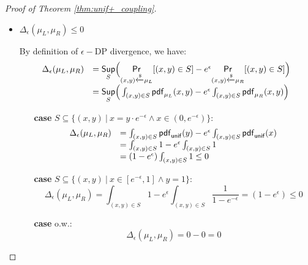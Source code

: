 \documentclass[a4paper,11pt]{article}
\begin{document}
\begin{proof}[Proof of Theorem \ref{thm:unif+_coupling}]
\begin{itemize}
\begin{itemize}
		\item $\projr(\mu_R) = \mu_2$ 

		Equivalent to show$\pdf_{\projr(\mu_R)}  = \pdf_{\mu_2}$.

		By definition of the $\projr$ and $\pdf$ of $\mu_R$, we have $\forall y \in \float$:
		\[
			\pdf_{\projr(\mu_R)}(y) = 
			\begin{cases}
			\int_{x}\pdf_{\uniform}(x) 
			& x = y \cdot e^{-\epsilon} \land y \in (0, 1)\\
			\int_{x} \frac{1}{1 - e^{-\epsilon}} 
			& x \in [e^{-\epsilon}, 1] \land y = 1\\
			0       & o.w.
			\end{cases} 
			= 
			\begin{cases}
			1 & y \in (0, 1)\\
			1 & y = 1\\
			0       & o.w.
			\end{cases}
			=
			\pdf_{\mu_2}(y)
		\]
	\end{itemize}	

	\item $\Delta_{\epsilon}(\mu_L, \mu_R) \leq 0$

	By definition of $\epsilon-$DP divergence, we have:
	 \[
	 \begin{array}{ll}
	 \Delta_{\epsilon}(\mu_L, \mu_R) 
	 & = \underset{S}{\mathsf{Sup}}
	 \Big(
	 \underset{(x,y) \xleftarrow{\$} \mu_L}{\mathsf{Pr}}[(x,y) \in S] - e^{\epsilon} \underset{(x,y) \xleftarrow{\$} \mu_R}{\mathsf{Pr}}[(x,y) \in S]
	 \Big) \\
	 & =\underset{S}{\mathsf{Sup}}
	 \Big(
	 \int_{(x,y) \in S} \mathsf{pdf}_{\mu_L}(x, y) - e^{\epsilon} \int_{(x,y) \in S} \mathsf{pdf}_{\mu_R}(x, y)
	 \Big)	 
	 \end{array}
	 \]
	 \begin{itemize}
	 	\item[{\bf case}]
	 	$S \subseteq \{(x, y) ~|~ 
	 	x = y \cdot e^{-\epsilon}  \land x \in (0, e^{-\epsilon}) \}$:
		\[
		 \begin{array}{ll}
		 \Delta_{\epsilon}(\mu_L, \mu_R) 
		 & = 
		 \int_{(x,y) \in S} \mathsf{pdf}_{\mathsf{unif}}(y) - e^{\epsilon} \int_{(x,y) \in S} \mathsf{pdf}_{\mathsf{unif}}(x)\\
		 & = 
		 \int_{(x,y) \in S} 1 - e^{\epsilon} \int_{(x,y) \in S} 1\\ 
		 & = 
		 (1 - e^{\epsilon})\int_{(x,y) \in S} 1
		 \leq 0 
		 \end{array}
		 \]
	 	\item[{\bf case}] $S \subseteq \{(x, y) 
	 	~|~ x \in [e^{-\epsilon}, 1] \land y = 1 \}$:
		 \[
		 \Delta_{\epsilon}(\mu_L, \mu_R) 
		 = 
		 \int_{(x,y) \in S} 1 - e^{\epsilon} \int_{(x,y) \in S} \frac{1}{1 - e^{-\epsilon}}
		   = (1 - e^{\epsilon}) \leq 0
		 \]
	 	\item[{\bf case}] o.w.:
		 \[
		 \Delta_{\epsilon}(\mu_L, \mu_R) = 0 - 0 =  0 
		 \]	 	

	 \end{itemize}

\end{itemize}
\end{proof}
\end{document}
